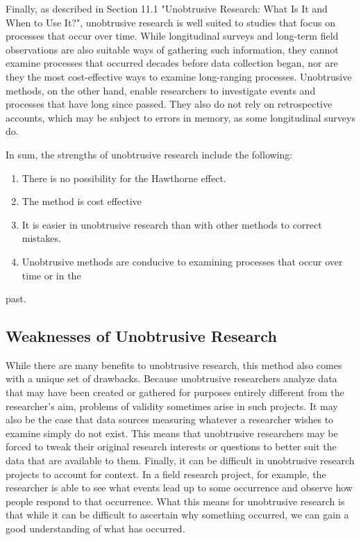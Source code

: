 Finally, as described in Section 11.1 "Unobtrusive Research: What Is It and When to Use It?", unobtrusive research is well suited to studies that focus on processes that occur over time. While longitudinal surveys and long-term field observations are also suitable ways of gathering such information, they cannot examine processes that occurred decades before data collection began, nor are they the most cost-effective ways to examine long-ranging processes. Unobtrusive methods, on the other hand, enable researchers to investigate events and processes that have long since passed. They also do not rely on retrospective accounts, which may be subject to errors in memory, as some longitudinal surveys do.

In sum, the strengths of unobtrusive research include the following:

\begin{enumerate}
	\item There is no possibility for the Hawthorne effect.
	\item The method is cost effective
	\item It is easier in unobtrusive research than with other methods to correct mistakes.
	\item Unobtrusive methods are conducive to examining processes that occur over time or in the 
\end{enumerate}past.

\subsection{Weaknesses of Unobtrusive Research}

While there are many benefits to unobtrusive research, this method also comes with a unique set of drawbacks. Because unobtrusive researchers analyze data that may have been created or gathered for purposes entirely different from the researcher’s aim, problems of validity sometimes arise in such projects. It may also be the case that data sources measuring whatever a researcher wishes to examine simply do not exist. This means that unobtrusive researchers may be forced to tweak their original research interests or questions to better suit the data that are available to them. Finally, it can be difficult in unobtrusive research projects to account for context. In a field research project, for example, the researcher is able to see what events lead up to some occurrence and observe how people respond to that occurrence. What this means for unobtrusive research is that while it can be difficult to ascertain why something occurred, we can gain a good understanding of what has occurred.

